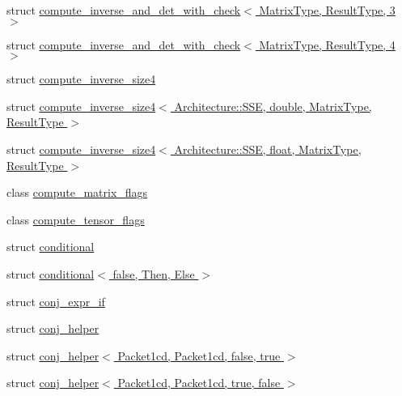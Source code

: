 \begin{DoxyCompactItemize}
\item 
struct \hyperlink{struct_eigen_1_1internal_1_1compute__inverse__and__det__with__check_3_01_matrix_type_00_01_result_type_00_013_01_4}{compute\+\_\+inverse\+\_\+and\+\_\+det\+\_\+with\+\_\+check$<$ Matrix\+Type, Result\+Type, 3 $>$}
\item 
struct \hyperlink{struct_eigen_1_1internal_1_1compute__inverse__and__det__with__check_3_01_matrix_type_00_01_result_type_00_014_01_4}{compute\+\_\+inverse\+\_\+and\+\_\+det\+\_\+with\+\_\+check$<$ Matrix\+Type, Result\+Type, 4 $>$}
\item 
struct \hyperlink{struct_eigen_1_1internal_1_1compute__inverse__size4}{compute\+\_\+inverse\+\_\+size4}
\item 
struct \hyperlink{struct_eigen_1_1internal_1_1compute__inverse__size4_3_01_architecture_1_1_s_s_e_00_01double_00_0ae07abd87bb6c7ddc3170cf276579ed0}{compute\+\_\+inverse\+\_\+size4$<$ Architecture\+::\+S\+S\+E, double, Matrix\+Type, Result\+Type $>$}
\item 
struct \hyperlink{struct_eigen_1_1internal_1_1compute__inverse__size4_3_01_architecture_1_1_s_s_e_00_01float_00_011c9f0f9df97321dfc4664a6d9e4a8f31}{compute\+\_\+inverse\+\_\+size4$<$ Architecture\+::\+S\+S\+E, float, Matrix\+Type, Result\+Type $>$}
\item 
class \hyperlink{class_eigen_1_1internal_1_1compute__matrix__flags}{compute\+\_\+matrix\+\_\+flags}
\item 
class \hyperlink{class_eigen_1_1internal_1_1compute__tensor__flags}{compute\+\_\+tensor\+\_\+flags}
\item 
struct \hyperlink{struct_eigen_1_1internal_1_1conditional}{conditional}
\item 
struct \hyperlink{struct_eigen_1_1internal_1_1conditional_3_01false_00_01_then_00_01_else_01_4}{conditional$<$ false, Then, Else $>$}
\item 
struct \hyperlink{struct_eigen_1_1internal_1_1conj__expr__if}{conj\+\_\+expr\+\_\+if}
\item 
struct \hyperlink{struct_eigen_1_1internal_1_1conj__helper}{conj\+\_\+helper}
\item 
struct \hyperlink{struct_eigen_1_1internal_1_1conj__helper_3_01_packet1cd_00_01_packet1cd_00_01false_00_01true_01_4}{conj\+\_\+helper$<$ Packet1cd, Packet1cd, false, true $>$}
\item 
struct \hyperlink{struct_eigen_1_1internal_1_1conj__helper_3_01_packet1cd_00_01_packet1cd_00_01true_00_01false_01_4}{conj\+\_\+helper$<$ Packet1cd, Packet1cd, true, false $>$}

\end{DoxyCompactItemize}

